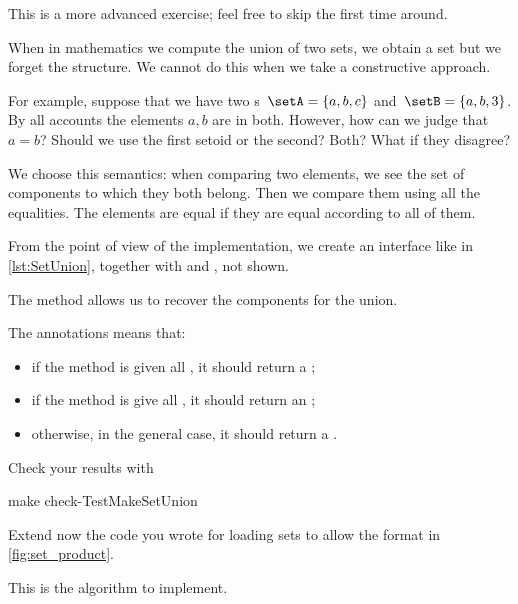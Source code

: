\begin{remark}
	This is a more advanced exercise; feel free to skip the first time around.
\end{remark}

When in mathematics we compute the union of two sets, we obtain a set but we forget the structure.
We cannot do this when we take a constructive approach.

For example, suppose that we have two \Setoid{}s~$\setA = \{a,b,c\}$ and~$\setB = \{a,b,3\}$.
By all accounts the elements $a,b$ are in both.
However, how can we judge that~$a=b$?
Should we use the first setoid or the second?
Both?
What if they disagree?

We choose this semantics: when comparing two elements, we see the set of components to which they both belong.
Then we compare them using all the equalities.
The elements are equal if they are equal according to all of them.

From the point of view of the implementation, we create an interface like in \cref{lst:SetUnion}, together with \EnumerableSetUnion and \FiniteSetUnion, not shown.


The method  allows us to recover the components for the union.


The  annotations means that:
\begin{itemize}
	\item if the method is given all \FiniteSet, it should return a \FiniteSet;
	\item if the method is give all \EnumerableSet, it should return an \EnumerableSet;
	\item otherwise, in the general case, it should return a \Setoid.
\end{itemize}

Check your results with
\begin{console}
	make check-TestMakeSetUnion
\end{console}


Extend now the code you wrote for loading sets to allow the format in \cref{fig:set_product}.

This is the algorithm to implement.

